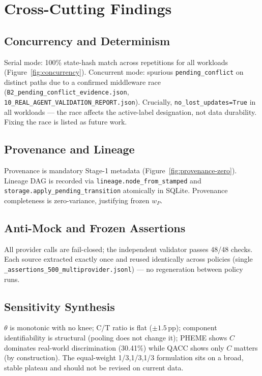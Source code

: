 \documentclass[12pt,a4paper]{article}
\begin{document}
\section{Cross-Cutting Findings}

\subsection{Concurrency and Determinism}
\label{sec:concurrency}
Serial mode: 100\% state-hash match across repetitions for all workloads (Figure~\ref{fig:concurrency}). Concurrent mode: spurious \texttt{pending\_conflict} on distinct paths due to a confirmed middleware race (\texttt{B2\_pending\_conflict\_evidence.json}, \texttt{10\_REAL\_AGENT\_VALIDATION\_REPORT.json}). Crucially, \texttt{no\_lost\_updates=True} in all workloads --- the race affects the active-label designation, not data durability. Fixing the race is listed as future work.

\subsection{Provenance and Lineage}
Provenance is mandatory Stage-1 metadata (Figure~\ref{fig:provenance-zero}). Lineage DAG is recorded via \texttt{lineage.node\_from\_stamped} and \texttt{storage.apply\_pending\_transition} atomically in SQLite. Provenance completeness is zero-variance, justifying frozen $w_P$.

\subsection{Anti-Mock and Frozen Assertions}
All provider calls are fail-closed; the independent validator passes 48/48 checks. Each source extracted exactly once and reused identically across policies (single \texttt{\_assertions\_500\_multiprovider.jsonl}) --- no regeneration between policy runs.

\subsection{Sensitivity Synthesis}
$\theta$ is monotonic with no knee; C/T ratio is flat ($\pm1.5$\,pp); component identifiability is structural (pooling does not change it); PHEME shows $C$ dominates real-world discrimination (30.41\%) while QACC shows only $C$ matters (by construction). The equal-weight 1/3,1/3,1/3 formulation sits on a broad, stable plateau and should not be revised on current data.
\end{document}
